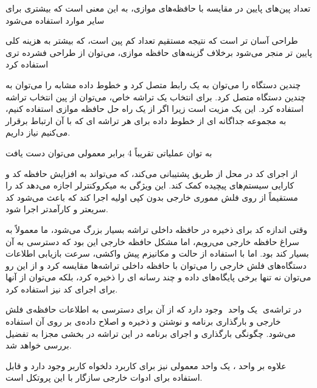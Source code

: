  تعداد پین‌های پایین در مقایسه با حافظه‌های موازی، به این معنی است که  بیشتری برای سایر موارد استفاده می‌شود

 طراحی  آسان تر است که نتیجه مستقیم تعداد کم پین است، که بیشتر به هزینه کلی پایین تر منجر می‌شود برخلاف گزینه‌های حافظه موازی، می‌توان از طراحی فشرده تری استفاده کرد

 چندین دستگاه را می‌توان به یک رابط  متصل کرد و خطوط داده مشابه را می‌توان به چندین دستگاه متصل کرد. برای انتخاب یک تراشه خاص، می‌توان از پین انتخاب تراشه استفاده کرد. این یک مزیت است زیرا اگر از یک راه حل حافظه موازی استفاده کنیم، به مجموعه جداگانه ای از خطوط داده برای هر تراشه ای که با آن ارتباط برقرار می‌کنیم نیاز داریم.

 به توان عملیاتی تقریباً 4 برابر  معمولی می‌توان دست یافت

 از اجرای کد در محل از طریق  پشتیبانی می‌کند، که می‌تواند به افزایش حافظه کد و کارایی سیستم‌های پیچیده کمک کند. این ویژگی به میکروکنترلر اجازه می‌دهد کد را مستقیماً از روی فلش مموری خارجی بدون کپی اولیه اجرا کند که باعث می‌شود کد سریعتر و کارآمدتر اجرا شود.


وقتی اندازه کد برای ذخیره در حافظه داخلی تراشه بسیار بزرگ می‌شود، ما معمولاً به سراغ حافظه خارجی می‌رویم، اما مشکل حافظه خارجی این بود که دسترسی به آن بسیار کند بود. اما با استفاده از حالت  و مکانیزم پیش واکشی، سرعت بازیابی اطلاعات دستگاه‌های فلش خارجی را می‌توان با حافظه داخلی تراشه‌ها مقایسه کرد و از این رو می‌توان نه تنها برخی پایگاه‌های داده و چند رسانه ای را ذخیره کرد، بلکه می‌توان از آنها برای اجرای کد نیز استفاده کرد.

در تراشه‌ی ‌ یک واحد ‌ وجود دارد که از آن برای دسترسی به اطلاعات حافظه‌ی فلش خارجی و بارگذاری برنامه و نوشتن و ذخیره و اصلاح داده‌ی بر روی آن استفاده می‌شود. چگونگی بارگذاری و اجرای برنامه در این تراشه در بخشی مجزا به تفضیل بررسی خواهد شد.

علاوه بر واحد ، یک واحد  معمولی نیز برای کاربرد دلخواه کاربر وجود دارد و قابل استفاده برای ادوات خارجی سازگار با این پروتکل است.


